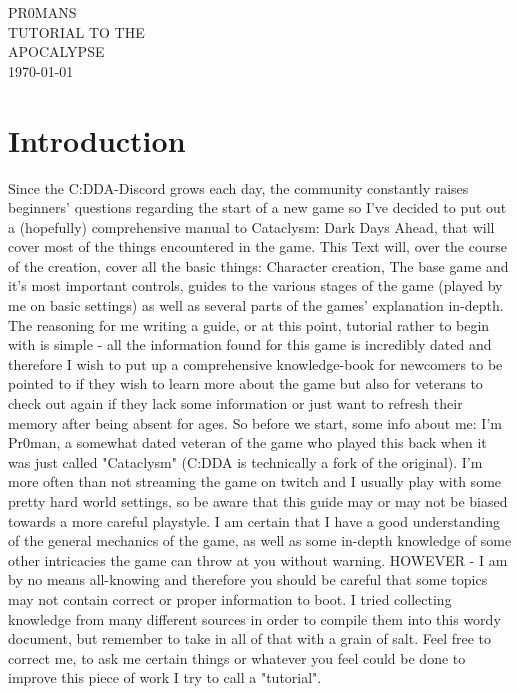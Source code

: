 \documentclass[11pt]{report}
\begin{document}
\vspace*{3cm}
\begin{center}
\uppercase{
\fontsize{3.4cm}{3.4cm}\selectfont
Pr0mans\\
\fontsize{1.5cm}{2cm}\selectfont Tutorial to the\\
\fontsize{2.5cm}{2.5cm}\selectfont Apocalypse}\\
\normalsize \vspace{5cm} \today
\end{center}

\tableofcontents

\raggedright
\chapter{Introduction}
 
Since the C:DDA-Discord grows each day, the community constantly raises beginners' questions regarding the start of a new game so I've decided to put out a (hopefully) comprehensive manual to Cataclysm: Dark Days Ahead, that will cover most of the things encountered in the game. This Text will, over the course of the creation, cover all the basic things: Character creation, The base game and it's most important controls, guides to the various stages of the game (played by me on basic settings) as well as several parts of the games' explanation in-depth.
The reasoning for me writing a guide, or at this point, tutorial rather to begin with is simple - all the information found for this game is incredibly dated and therefore I wish to put up a comprehensive knowledge-book for newcomers to be pointed to if they wish to learn more about the game but also for veterans to check out again if they lack some information or just want to refresh their memory after being absent for ages.
So before we start, some info about me: I'm Pr0man, a somewhat dated veteran of the game who played this back when it was just called "Cataclysm" (C:DDA is technically a fork of the original). I'm more often than not streaming the game on twitch and I usually play with some pretty hard world settings, so be aware that this guide may or may not be biased towards a more careful playstyle. I am certain that I have a good understanding of the general mechanics of the game, as well as some in-depth knowledge of some other intricacies the game can throw at you without warning.
HOWEVER - I am by no means all-knowing and therefore you should be careful that some topics may not contain correct or proper information to boot. I tried collecting knowledge from many different sources in order to compile them into this wordy document, but remember to take in all of that with a grain of salt. Feel free to correct me, to ask me certain things or whatever you feel could be done to improve this piece of work I try to call a "tutorial".
\end{document}
